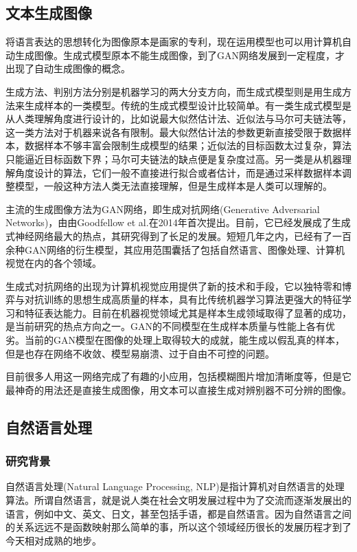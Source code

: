 \subsection{文本生成图像}
将语言表达的思想转化为图像原本是画家的专利，现在运用模型也可以用计算机自动生成图像。生成式模型原本不能生成图像，到了GAN网络发展到一定程度，才出现了自动生成图像的概念。

生成方法、判别方法分别是机器学习的两大分支方向，而生成式模型则是用生成方法来生成样本的一类模型。传统的生成式模型设计比较简单。有一类生成式模型是从人类理解角度进行设计的，比如说最大似然估计法、近似法与马尔可夫链法等，这一类方法对于机器来说各有限制。最大似然估计法的参数更新直接受限于数据样本，数据样本不够丰富会限制生成模型的结果；近似法的目标函数太过复杂，算法只能逼近目标函数下界；马尔可夫链法的缺点便是复杂度过高。另一类是从机器理解角度设计的算法，它们一般不直接进行拟合或者估计，而是通过采样数据样本调整模型，一般这种方法人类无法直接理解，但是生成样本是人类可以理解的。

主流的生成图像方法为GAN网络，即生成对抗网络(Generative Adversarial Networks)，由由Goodfellow et al.在2014年首次提出。目前，它已经发展成了生成式神经网络最大的热点，其研究得到了长足的发展。短短几年之内，已经有了一百余种GAN网络的衍生模型，其应用范围囊括了包括自然语言、图像处理、计算机视觉在内的各个领域。

生成式对抗网络的出现为计算机视觉应用提供了新的技术和手段，它以独特零和博弈与对抗训练的思想生成高质量的样本，具有比传统机器学习算法更强大的特征学习和特征表达能力。目前在机器视觉领域尤其是样本生成领域取得了显著的成功，是当前研究的热点方向之一。GAN的不同模型在生成样本质量与性能上各有优劣。当前的GAN模型在图像的处理上取得较大的成就，能生成以假乱真的样本，但是也存在网络不收敛、模型易崩溃、过于自由不可控的问题。

目前很多人用这一网络完成了有趣的小应用，包括模糊图片增加清晰度等，但是它最神奇的用法还是直接生成图像，用文本可以直接生成对辨别器不可分辨的图像。

\subsection{自然语言处理}
\subsubsection{研究背景}
自然语言处理(Natural Language Processing, NLP)是指计算机对自然语言的处理算法。所谓自然语言，就是说人类在社会文明发展过程中为了交流而逐渐发展出的语言，例如中文、英文、日文，甚至包括手语，都是自然语言。因为自然语言之间的关系远远不是函数映射那么简单的事，所以这个领域经历很长的发展历程才到了今天相对成熟的地步。

